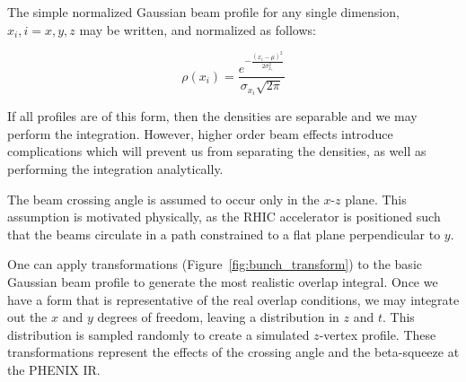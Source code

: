 {\noindent}The simple normalized Gaussian beam profile for any single dimension,
$x_i, i=x, y, z$  may be written, and normalized as follows:

\begin{equation}
\label{eq:simplegaussian}
\rho(x_{i}) = \frac{e^{ -\frac{(x_{i}-\mu)^2}{2\sigma_{x_i}^2}}}{\sigma_{x_i}\sqrt{2\pi}}
\end{equation}

{\noindent}If all profiles are of this form, then the densities are separable
and we may perform the integration. However, higher order beam effects introduce
complications which will prevent us from separating the densities, as well as
performing the integration analytically.

The beam crossing angle is assumed to occur only in the $x$-$z$ plane. This
assumption is motivated physically, as the RHIC accelerator is positioned such
that the beams circulate in a path constrained to a flat plane perpendicular to
$y$.

One can apply transformations (Figure~\ref{fig:bunch_transform}) to the basic
Gaussian beam profile to generate the most realistic overlap integral. Once we
have a form that is representative of the real overlap conditions, we may
integrate out the $x$ and $y$ degrees of freedom, leaving a distribution in $z$
and $t$. This distribution is sampled randomly to create a simulated $z$-vertex
profile. These transformations represent the effects of the crossing angle and
the beta-squeeze at the PHENIX IR.


